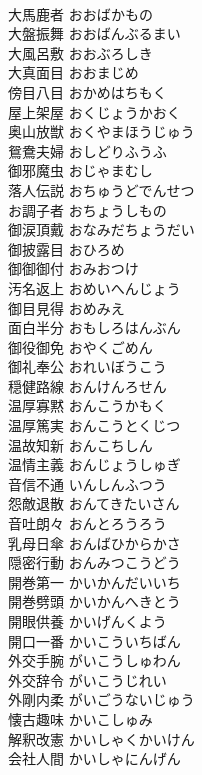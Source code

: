\documentclass[8pt]{extreport}
\begin{document}
\begin{CJK}{UTF8}{min}
\\	大馬鹿者	おおばかもの	
\\	大盤振舞	おおばんぶるまい	
\\	大風呂敷	おおぶろしき	
\\	大真面目	おおまじめ	
\\	傍目八目	おかめはちもく	
\\	屋上架屋	おくじょうかおく	
\\	奥山放獣	おくやまほうじゅう	
\\	鴛鴦夫婦	おしどりふうふ	
\\	御邪魔虫	おじゃまむし	
\\	落人伝説	おちゅうどでんせつ	
\\	お調子者	おちょうしもの	
\\	御涙頂戴	おなみだちょうだい	
\\	御披露目	おひろめ	
\\	御御御付	おみおつけ	
\\	汚名返上	おめいへんじょう	
\\	御目見得	おめみえ	
\\	面白半分	おもしろはんぶん	
\\	御役御免	おやくごめん	
\\	御礼奉公	おれいぼうこう	
\\	穏健路線	おんけんろせん	
\\	温厚寡黙	おんこうかもく	
\\	温厚篤実	おんこうとくじつ	
\\	温故知新	おんこちしん	
\\	温情主義	おんじょうしゅぎ	
\\	音信不通	いんしんふつう	
\\	怨敵退散	おんてきたいさん	
\\	音吐朗々	おんとろうろう	
\\	乳母日傘	おんばひからかさ	
\\	隠密行動	おんみつこうどう	
\\	開巻第一	かいかんだいいち	
\\	開巻劈頭	かいかんへきとう	
\\	開眼供養	かいげんくよう	
\\	開口一番	かいこういちばん	
\\	外交手腕	がいこうしゅわん	
\\	外交辞令	がいこうじれい	
\\	外剛内柔	がいごうないじゅう	
\\	懐古趣味	かいこしゅみ	
\\	解釈改憲	かいしゃくかいけん	
\\	会社人間	かいしゃにんげん	

\end{CJK}
\end{document}
